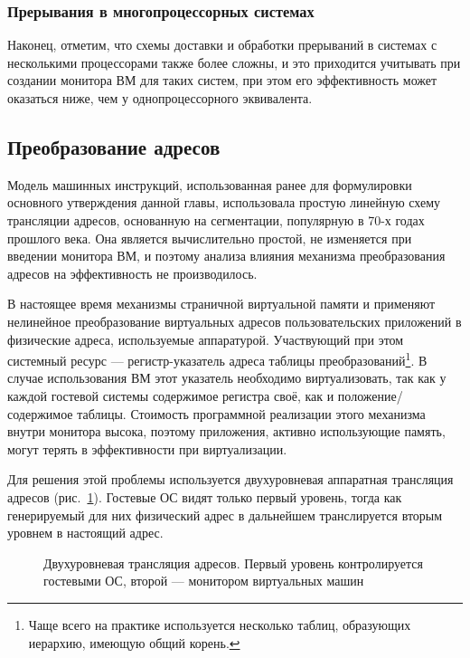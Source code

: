 \subsubsection{Прерывания в многопроцессорных системах}

Наконец, отметим, что схемы доставки и обработки прерываний в системах с несколькими процессорами также более сложны, и это приходится учитывать при создании монитора ВМ для таких систем, при этом его эффективность может оказаться ниже, чем у однопроцессорного эквивалента. 

\subsection{Преобразование адресов}

Модель машинных инструкций, использованная ранее для формулировки основного утверждения данной главы, использовала простую линейную схему трансляции адресов, основанную на сегментации, популярную в 70-х годах прошлого века. Она является вычислительно простой, не изменяется при введении монитора ВМ, и поэтому анализа влияния механизма преобразования адресов на эффективность не производилось.

В настоящее время механизмы страничной виртуальной памяти и применяют нелинейное преобразование виртуальных адресов пользовательских приложений в физические адреса, используемые аппаратурой. Участвующий при этом системный ресурс — регистр-указатель адреса таблицы преобразований\footnote{Чаще всего на практике используется несколько таблиц, образующих иерархию, имеющую общий корень.}. В случае использования ВМ этот указатель необходимо виртуализовать, так как у каждой гостевой системы содержимое регистра своё, как и положение/содержимое таблицы. Стоимость программной реализации этого механизма внутри монитора высока, поэтому приложения, активно использующие память, могут терять в эффективности при виртуализации.

Для решения этой проблемы используется двухуровневая аппаратная трансляция адресов (рис.~\ref{fig:two-level-translation}). Гостевые ОС видят только первый уровень, тогда как генерируемый для них физический адрес в дальнейшем транслируется вторым уровнем в настоящий адрес.

\begin{figure}[htb]
    \centering
    \caption[Двухуровневая трансляция адресов]{Двухуровневая трансляция адресов. Первый уровень контролируется гостевыми ОС, второй — монитором виртуальных машин}
    \label{fig:two-level-translation}
\end{figure}

